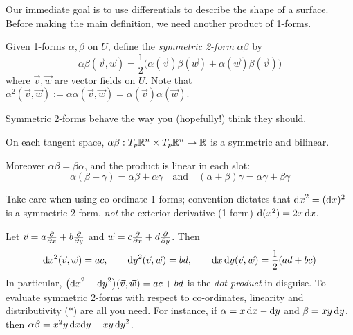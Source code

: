 Our immediate goal is to use differentials to describe the shape of a surface. Before making the main definition, we need  another product of 1-forms.

\begin{defn}{}{}
	Given 1-forms $\alpha,\beta$ on $U$, define the \emph{symmetric 2-form} $\alpha\beta$ by
	\[
		\alpha\beta(\vec v,\vec w) =\frac{1}{2}\bigl(\alpha(\vec v)\beta(\vec w)+\alpha(\vec w)\beta(\vec v)\bigr)
		\]
	where $\vec v,\vec w$ are vector fields on $U$. Note that $\alpha^2(\vec v,\vec w):=\alpha\alpha(\vec v,\vec w)=\alpha(\vec v)\alpha(\vec w)$.
\end{defn}

Symmetric 2-forms behave the way you (hopefully!) think they should.

\begin{lemm}{}{}
	On each tangent space, $\alpha\beta:T_p\mathbb{R}^n\times T_p\mathbb{R}^n\to\mathbb{R}$ is a symmetric and bilinear.\par
	Moreover $\alpha\beta=\beta\alpha$, and the product is linear in each slot:
	\[
		\alpha(\beta+\gamma)=\alpha\beta+\alpha\gamma\quad\text{and}\quad (\alpha+\beta)\gamma=\alpha\gamma+\beta\gamma
		\tag{$\ast$}
	\]
\end{lemm}


Take care when using co-ordinate 1-forms; convention dictates that ${\mathrm{d} x}^2=({\mathrm{d} x})^2$ is a symmetric 2-form, \emph{not} the exterior derivative (1-form) $\mathrm{d}(x^2)=2x\,{\mathrm{d} x}$.

\begin{example}{}{}
	Let $\vec v=a\frac{\partial }{\partial x}+b\frac{\partial }{\partial y}$ and $\vec w=c\frac{\partial }{\partial x}+d\frac{\partial }{\partial y}$. Then
	\[
		{\mathrm{d} x}^2(\vec v,\vec w)=ac,\qquad {\mathrm{d}y}^2(\vec v,\vec w)=bd,\qquad {\mathrm{d}x}\,{\mathrm{d} y}(\vec v,\vec w)=\frac 12(ad+bc)
	\]
	In particular, $\bigl({\mathrm{d} x}^2+{\mathrm{d} y}^2\bigr)(\vec v,\vec w)=ac+bd$ is the \emph{dot product} in disguise.\smallbreak
	To evaluate symmetric 2-forms with respect to co-ordinates, linearity and distributivity ($\ast$) are all you need. For instance, if $\alpha =x\,{\mathrm{d} x}-{\mathrm{d} y}$ and $\beta =xy\,{\mathrm{d} y}$, then $\alpha\beta=x^2y\,{\mathrm{d} x}{\mathrm{d} y}-xy\,{\mathrm{d} y}^2$.
\end{example}


